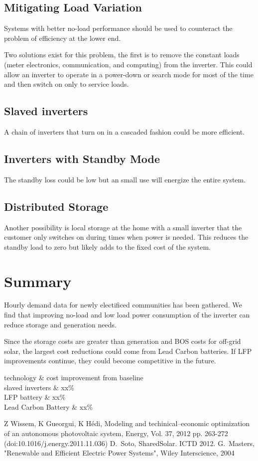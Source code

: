 \documentclass[conference]{IEEEtran}
\begin{document}
\subsection{Mitigating Load Variation}
Systems with better no-load performance should be used to counteract
the problem of efficiency at the lower end.

Two solutions exist for this problem, the first is to remove
the constant loads (meter electronics, communication, and
computing) from the inverter.
This could allow an inverter to operate in a power-down or
search mode for most of the time and then switch on only
to service loads.

\subsection{Slaved inverters}
A chain of inverters that turn on in a cascaded fashion could
be more efficient.

\subsection{Inverters with Standby Mode}
The standby loss could be low but an small use will energize the
entire system.




\subsection{Distributed Storage}
Another possibility is local storage at the home with a small inverter
that the customer only switches on during times when power
is needed.
This reduces the standby load to zero but likely adds to the
fixed cost of the system.


\section{Summary}
Hourly demand data for newly electificed communities has been gathered.
We find that improving no-load and low load power consumption of the
inverter can reduce storage and generation needs.

Since the storage costs are greater than generation and BOS costs
for off-grid solar, the largest cost reductions could come from
Lead Carbon batteries.
If LFP improvements continue, they could become competitive in the
future.



technology \& cost improvement from baseline \\
slaved inverters    \& xx\% \\
LFP battery         \& xx\% \\
Lead Carbon Battery \& xx\% \\


\begin{thebibliography}{1}
Z Wissem, K Gueorgui, K H\'edi,
Modeling and techinical--economic optimization of an autonomous
photovoltaic system,
Energy, Vol. 37, 2012 pp. 263-272
(doi:10.1016/j.energy.2011.11.036)
D.~Soto, SharedSolar. ICTD 2012.
G.~Masters,
"Renewable and Efficient Electric Power Systems",
Wiley Interscience,
2004
\end{thebibliography}
\end{document}
